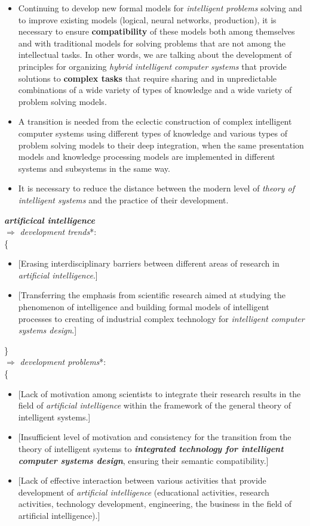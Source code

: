 \documentclass[10pt, a4paper]{proc}
\begin{document}
 \begin{itemize}
  \item  Continuing to develop new formal models for \textit{intelligent problems} solving and to improve existing models (logical, neural networks, production), it is necessary to ensure \textbf{compatibility} of these models both among themselves and with traditional models for solving problems that are not among the intellectual tasks. In other words, we are talking about the development of principles for organizing \textit{hybrid intelligent computer systems} that provide solutions to \textbf{complex tasks} that require sharing and in unpredictable combinations of a wide variety of types of knowledge and a wide variety of problem solving models.
  \item A transition is needed from the eclectic construction of complex intelligent computer systems using different types of knowledge and various types of problem solving models to their deep integration, when the same presentation models and knowledge processing models are implemented in different systems and subsystems in the same way.
  \item It is necessary to reduce the distance between the modern level of \textit{theory of intelligent systems}    and the practice of their development.
 \end{itemize}
 \noindent\textbf{\textit{artificical intelligence}}\\
 \(\Rightarrow\) \textit{development trends}*:\\
 \{
 \begin{itemize}
  \item \([\)Erasing interdisciplinary barriers between different areas of research in \textit{artificial intelligence}.]
  \item \([\)Transferring the emphasis from scientific research aimed at studying the phenomenon of intelligence and building formal models of intelligent processes to creating of industrial complex technology for \textit{intelligent computer systems design}.]
 \end{itemize}
 \}\\
 \(\Rightarrow\) \textit{development problems}*:\\
 \{
 \begin{itemize}
  \item \([\)Lack of motivation among scientists to integrate their research results in the field of \textit{artificial intelligence} within the framework of the general theory of intelligent systems.]
  \item \([\)Insufficient level of motivation and consistency for the transition from the theory of intelligent systems to \textbf{\textit{integrated technology for intelligent computer systems design}}, ensuring their semantic compatibility.]
  \item \([\)Lack of effective interaction between various activities that provide development of \textit{artificial intelligence} (educational activities, research activities, technology development, engineering, the business in the field of artificial intelligence).]
 \end{itemize}
\end{document}
